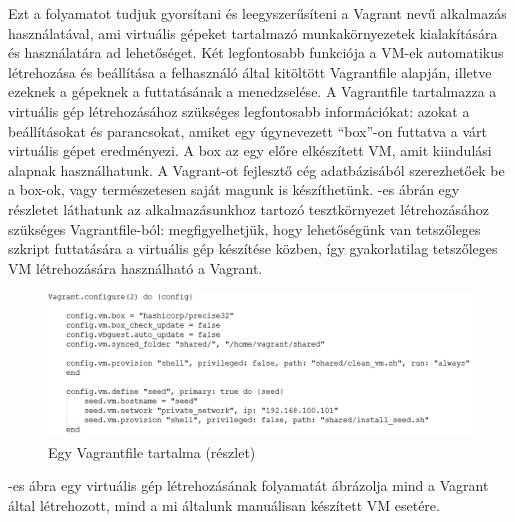 Ezt a folyamatot tudjuk gyorsítani és leegyszerűsíteni a Vagrant\cite{vagrant} nevű alkalmazás használatával, ami virtuális gépeket tartalmazó munkakörnyezetek kialakítására és használatára ad lehetőséget. Két legfontosabb funkciója a VM-ek automatikus létrehozása és beállítása a felhasználó által kitöltött Vagrantfile alapján, illetve ezeknek a gépeknek a futtatásának a menedzselése. A Vagrantfile tartalmazza a virtuális gép létrehozásához szükséges legfontosabb információkat: azokat a beállításokat és parancsokat, amiket egy úgynevezett ``box''-on futtatva a várt virtuális gépet eredményezi. A box az egy előre elkészített VM, amit kiindulási alapnak használhatunk. A Vagrant-ot fejlesztő cég adatbázisából\cite{atlas} szerezhetőek be a box-ok, vagy természetesen saját magunk is készíthetünk. -es ábrán egy részletet láthatunk az alkalmazásunkhoz tartozó tesztkörnyezet létrehozásához szükséges Vagrantfile-ból: megfigyelhetjük, hogy lehetőségünk van tetszőleges szkript futtatására a virtuális gép készítése közben, így gyakorlatilag tetszőleges VM létrehozására használható a Vagrant.

\begin{figure}[ht]
	\centering
	\includegraphics[width=140mm, keepaspectratio]{figures/vagrantfile.png}
	\caption{Egy Vagrantfile tartalma (részlet)}
	\label{fig:vagrantfile}
\end{figure}

-es ábra egy virtuális gép létrehozásának folyamatát ábrázolja mind a Vagrant által létrehozott, mind a mi általunk manuálisan készített VM esetére.

